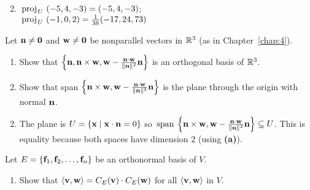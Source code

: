 \begin{multicols}{2}
\begin{ex}
\begin{enumerate}[label={\alph*.}]
\end{enumerate}
\begin{sol}
\begin{enumerate}[label={\alph*.}]
\setcounter{enumi}{1}
\item  $ \thinspace\operatorname{proj\medspace}_{\!U}\,{(-5, 4, -3)} = (-5, 4, -3)$; \\ $\thinspace\operatorname{proj\medspace}_{\!U}\,{(-1, 0, 2)} = \tfrac{1}{38}(-17, 24, 73) $

\end{enumerate}
\end{sol}
\end{ex}

\begin{ex}
Let $\textbf{n} \neq \textbf{0}$ and $\textbf{w} \neq \textbf{0}$ be nonparallel vectors in $\mathbb{R}^3$ (as in Chapter~\ref{chap:4}).

\begin{enumerate}[label={\alph*.}]
\item Show that $ \left\{\textbf{n}, \textbf{n} \times \textbf{w}, \textbf{w} - \tfrac{\textbf{n} \cdot \textbf{w}}{\| \textbf{n} \| ^2} \textbf{n} \right\}$ is an orthogonal basis of $\mathbb{R}^3$.

\item Show that span $ \left\{\textbf{n} \times \textbf{w}, \textbf{w} - \tfrac{\textbf{n} \cdot \textbf{w}}{\| \textbf{n} \| ^2} \textbf{n} \right\} $ is the plane through the origin with normal $\textbf{n}$.

\end{enumerate}
\begin{sol}
\begin{enumerate}[label={\alph*.}]
\setcounter{enumi}{1}
\item  The plane is $U = \{\textbf{x} \mid \textbf{x} \cdot \textbf{n} = 0\}$ so $\thinspace\operatorname{span\medspace} \left\{\textbf{n} \times \textbf{w}, \textbf{w} - \tfrac{\textbf{n} \cdot \textbf{w}}{\| \textbf{n} \| ^2} \textbf{n} \right\} \subseteq U$. This is equality because both spaces have dimension $2$ (using \textbf{(a)}).

\end{enumerate}
\end{sol}
\end{ex}

\begin{ex}
Let $E = \{\textbf{f}_{1}, \textbf{f}_{2}, \dots, \textbf{f}_{n}\}$ be an orthonormal basis of $V$.

\begin{enumerate}[label={\alph*.}]
\item Show that $\langle\textbf{v}, \textbf{w}\rangle = C_{E}(\textbf{v}) \cdot C_{E}(\textbf{w})$ for all $\langle\textbf{v}, \textbf{w}\rangle$ in $V$.


\end{enumerate}
\end{ex}
\end{multicols}
